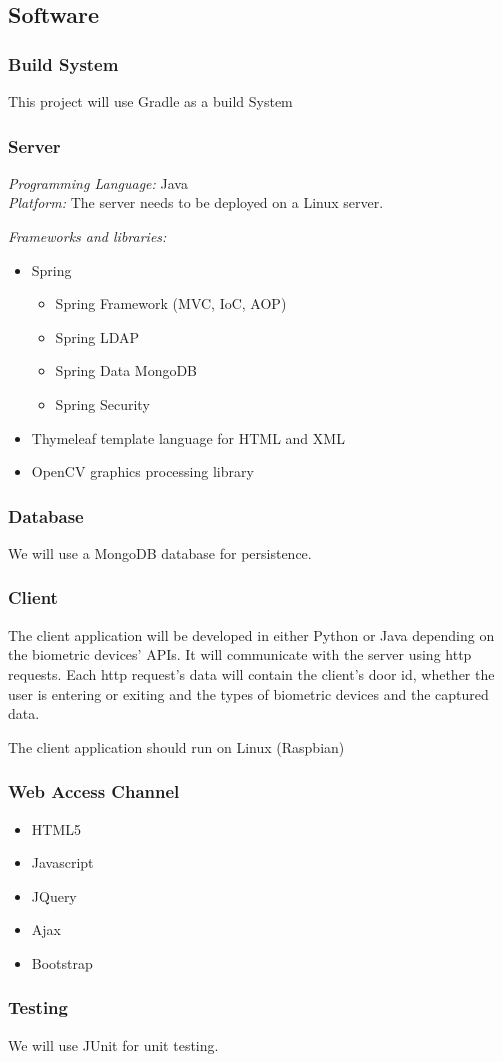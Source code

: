 \subsection{Software}

\subsubsection{Build System}
This project will use Gradle as a build System

\subsubsection{Server}
\textit{Programming Language:} Java \\
\textit{Platform:} The server needs to be deployed on a Linux server.

\textit{Frameworks and libraries:}
\begin{itemize}
	\item Spring
		\begin{itemize}
			\item Spring Framework (MVC, IoC, AOP)
			\item Spring LDAP
			\item Spring Data MongoDB
			\item Spring Security
		\end{itemize}
	\item Thymeleaf template language for HTML and XML
	\item OpenCV graphics processing library
\end{itemize}

\subsubsection{Database}
We will use a MongoDB database for persistence.

\subsubsection{Client}
The client application will be developed in either Python or Java depending on the biometric devices' APIs. It will communicate with the server using http requests. Each http request's data will contain the client's door id, whether the user is entering or exiting and the types of biometric devices and the captured data. 

The client application should run on Linux (Raspbian)

\subsubsection{Web Access Channel}
\begin{itemize}
	\item HTML5
	\item Javascript
	\item JQuery
	\item Ajax
	\item Bootstrap
\end{itemize}

\subsubsection{Testing}
We will use JUnit for unit testing.